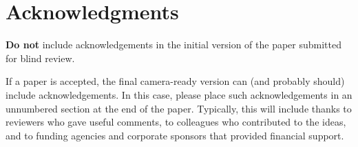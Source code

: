 \documentclass{article}
\begin{document}
\section*{Acknowledgments} 
 
\textbf{Do not} include acknowledgements in the initial version of
the paper submitted for blind review.

If a paper is accepted, the final camera-ready version can (and
probably should) include acknowledgements. In this case, please
place such acknowledgements in an unnumbered section at the
end of the paper. Typically, this will include thanks to reviewers
who gave useful comments, to colleagues who contributed to the ideas, 
and to funding agencies and corporate sponsors that provided financial 
support.  


\nocite{langley00}



\end{document}
